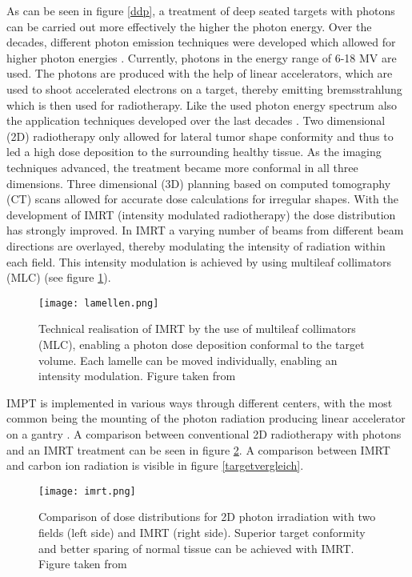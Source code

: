\documentclass[type=dr, dr=rernat, accentcolor=tud7b,colorbacktitle, bigchapter, openright, twoside, 12pt ]{tudthesis}
\begin{document}
As can be seen in figure \ref{ddp}, a treatment of deep seated targets with photons can be carried out more effectively the higher the photon 
energy. Over the decades, different photon emission techniques were developed which allowed for higher photon energies \cite{Lue12}. 
Currently, photons in the energy range of 6-18 MV \cite{Ber06} are used. The photons are produced with the help of linear accelerators, which 
are used to shoot accelerated electrons on a target, thereby emitting bremsstrahlung which is then used for radiotherapy.\newline
\newline
Like the used photon energy spectrum also the application techniques developed over the last decades \cite{Buc05}. Two dimensional (2D) 
radiotherapy only allowed for lateral tumor shape conformity and thus to led a high dose deposition to the surrounding healthy tissue. As the 
imaging techniques advanced, the treatment became more conformal in all three dimensions. Three dimensional (3D) planning based on computed 
tomography (CT) scans allowed for accurate dose calculations for irregular shapes. With the development of IMRT (intensity modulated 
radiotherapy) the dose distribution has strongly improved. In IMRT a varying number of beams from different beam directions are overlayed, 
thereby modulating the intensity of radiation within each field. This intensity modulation is achieved by using multileaf collimators (MLC) 
(see figure \ref{lamellen}). 

\begin{figure}[H]
\begin{center}
\texttt{[image: lamellen.png]}
\caption{Technical realisation of IMRT by the use of multileaf collimators (MLC), enabling a photon dose deposition conformal to the 
target volume. Each lamelle can be moved individually, enabling an intensity modulation. Figure taken from \cite{Sch01}}
\label{lamellen}
\end{center}
\end{figure}

IMPT is implemented in various ways through different centers, with the most common being the mounting of the 
photon radiation producing linear accelerator on a gantry \cite{Lue12}. A comparison between conventional 2D radiotherapy with photons 
and an IMRT treatment can be seen in figure \ref{imrt}. A comparison between IMRT and carbon ion radiation is visible in figure 
\ref{targetvergleich}.

\begin{figure}[H]
\begin{center}
\texttt{[image: imrt.png]}
\caption{Comparison of dose distributions for 2D photon irradiation with two fields (left side) and IMRT (right side). Superior target 
conformity and better sparing of normal tissue can be achieved with IMRT. Figure taken from \cite{Buc05}}
\label{imrt}
\end{center}
\end{figure}
\end{document}
